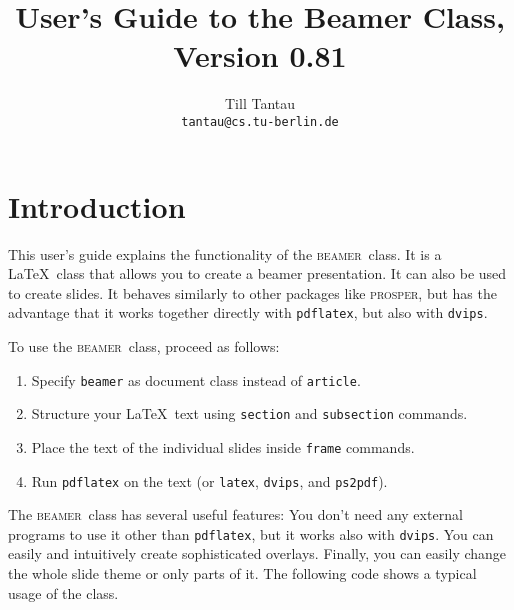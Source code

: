\documentclass{article}
\def\beamer{\textsc{beamer}}
\begin{document}
\title{User's Guide to the Beamer Class, Version 0.81}
\author{Till Tantau\\
  \texttt{tantau@cs.tu-berlin.de}}

\maketitle

\tableofcontents



\section{Introduction}

This user's guide explains the functionality of the \beamer\ class.
It is a \LaTeX\ class that allows you to create a beamer
presentation. It can also be used to create slides. It behaves
similarly to other packages like \textsc{prosper}, but has the
advantage that it works together directly with \texttt{pdflatex}, but
also with \texttt{dvips}.

To use the \beamer\ class, proceed as follows:
\begin{enumerate}
\item
  Specify \texttt{beamer} as document class instead of
  \texttt{article}.
\item
  Structure your \LaTeX\ text using \texttt{section} and
  \texttt{subsection} commands.
\item
  Place the text of the individual slides inside \texttt{frame}
  commands.
\item
  Run \texttt{pdflatex} on the text (or \texttt{latex},
  \texttt{dvips}, and \texttt{ps2pdf}).
\end{enumerate}

The \beamer\ class has several useful features: You don't need any
external programs to use it other than \texttt{pdflatex}, but it works
also with \texttt{dvips}. You can easily and intuitively create
sophisticated overlays. Finally, you can easily change the whole slide
theme or only parts of it. The following code shows a typical usage of
the class.
\end{document}
